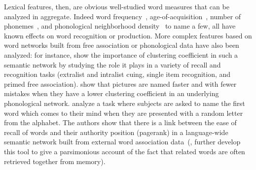  

\begin{new}

Lexical features, then, are obvious well-studied word measures that can be analyzed in aggregate.
Indeed word frequency~\citep[see][for a review]{yonelinas_nature_2002}, age-of-acquisition~\citep{zevin_age_2002}, number of phonemes~\citep[see for instance][]{rey_phoneme_1998,nickels_dissociating_2004}, and phonological neighborhood density~\citep{garlock_age--acquisition_2001} to name a few, all have known effects on word recognition or production.
More complex features based on word networks built from free association or phonological data have also been analyzed:
\citet{nelson_how_2013} for instance, show the importance of clustering coefficient in such a semantic network by studying the role it plays in a variety of recall and recognition tasks (extralist and intralist cuing, single item recognition, and primed free association).
\citet{chan_network_2010} show that pictures are named faster and with fewer mistakes when they have a lower clustering coefficient in an underlying phonological network.
\citet{griffiths_google_2007} analyze a task where subjects are asked to name the first word which comes to their mind when they are presented with a random letter from the alphabet.
The authors show that there is a link between the ease of recall of words and their authority position (pagerank) in a language-wide semantic network built from external word association data~(\citealp{austerweil_human_2012}, further develop this tool to give a parsimonious account of the fact that related words are often retrieved together from memory).

\end{new}

